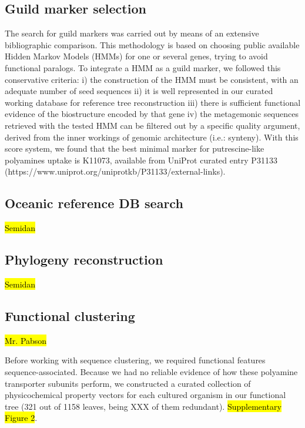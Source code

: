 \documentclass[Journal,letterpaper,NoLists]{ascelike-new}
\begin{document}
\subsection{Guild marker selection}

The search for guild markers was carried out by means of an extensive bibliographic comparison. This methodology is based on choosing public available Hidden Markov Models (HMMs) \cite{vasudevan2011structure} for one or several genes, trying to avoid functional paralogs. To integrate a HMM as a guild marker, we followed this conservative criteria: i) the construction of the HMM must be consistent, with an adequate number of seed sequences ii) it is well represented in our curated working database for reference tree reconstruction iii) there is sufficient functional evidence of the biostructure encoded by that gene iv) the metagemonic sequences retrieved with the tested HMM can be filtered out by a specific quality argument, derived from the inner workings of genomic architecture (i.e.: synteny). With this score system, we found that the best minimal marker for putrescine-like polyamines uptake is K11073, available from UniProt curated entry P31133 (https://www.uniprot.org/uniprotkb/P31133/external-links).

\subsection{Oceanic reference DB search}


\hl{Semidan}

\subsection{Phylogeny reconstruction}

\hl{Semidan}

\subsection{Functional clustering}

\hl{Mr. Pabson}

Before working with sequence clustering, we required functional features sequence-associated. Because we had no reliable evidence of how these polyamine transporter subunits perform, we constructed a curated collection of physicochemical property vectors for each cultured organism in our functional tree (321 out of 1158 leaves, being XXX of them redundant). \hl{Supplementary Figure 2}.
\end{document}
